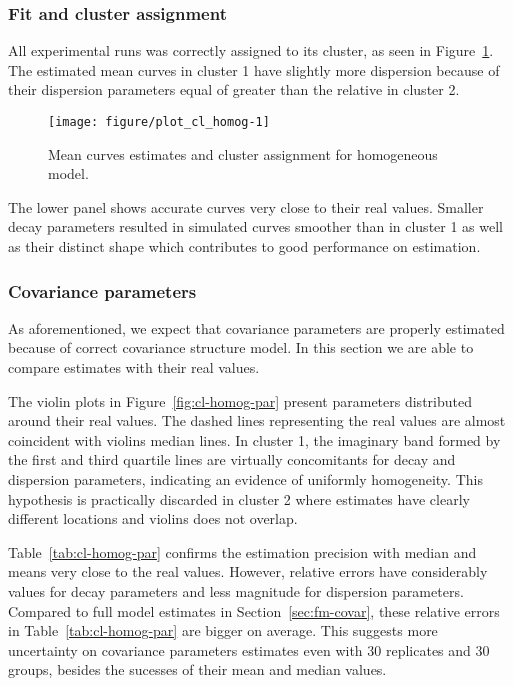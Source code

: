 \subsubsection{Fit and cluster assignment}
\label{sec:simu-cl-fit-homog}

All experimental runs was correctly assigned to its cluster, as seen in Figure~\ref{fig:cl-homog}. The estimated mean curves in cluster 1 have slightly more dispersion because of their dispersion parameters equal of greater than the relative in cluster 2.

\begin{figure}[t!]
  \centering
\begin{knitrout}
\color{fgcolor}
\texttt{[image: figure/plot\_cl\_homog-1]} 

\end{knitrout}
  \caption{Mean curves estimates and cluster assignment for homogeneous model.}
  \label{fig:cl-homog}
\end{figure}

The lower panel shows accurate curves very close to their real values. Smaller decay parameters resulted in simulated curves smoother than in cluster 1 as well as their distinct shape which contributes to good performance on estimation.


\subsubsection{Covariance parameters}
\label{sec:simu-cl-covar}

As aforementioned, we expect that covariance parameters are properly estimated because of correct covariance structure model. In this section we are able to compare estimates with their real values.

The violin plots in Figure~\ref{fig:cl-homog-par} present parameters distributed around their real values. The dashed lines representing the real values are almost coincident with violins median lines. In cluster 1, the imaginary band formed by the first and third quartile lines are virtually concomitants for decay and dispersion parameters, indicating an evidence of uniformly homogeneity. This hypothesis is practically discarded in cluster 2 where estimates have clearly different locations and violins does not overlap.

Table~\ref{tab:cl-homog-par} confirms the estimation precision with median and means very close to the real values. However, relative errors have considerably values for decay parameters and less magnitude for dispersion parameters. Compared to full model estimates in Section~\ref{sec:fm-covar}, these relative errors in Table~\ref{tab:cl-homog-par} are bigger on average. This suggests more uncertainty on covariance parameters estimates even with 30 replicates and 30 groups, besides the sucesses of their mean and median values.


